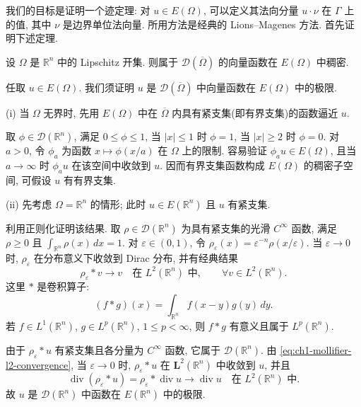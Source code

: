我们的目标是证明一个迹定理: 对 $u\in E(\Omega)$, 可以定义其法向分量 $u\cdot\nu$ 在 $\Gamma$ 上的值, 其中 $\nu$ 是边界单位法向量. 所用方法是经典的 Lions--Magenes 方法. 首先证明下述定理.

\begin{Theorem}
\label{thm:ch1-density-in-e}
设 $\Omega$ 是 $\mathbb R^n$ 中的 Lipschitz 开集. 则属于 $\mathbf{\mathcal D}(\overline\Omega)$ 的向量函数在 $E(\Omega)$ 中稠密.
\end{Theorem}

\begin{Proof}
任取 $u\in E(\Omega)$. 我们须证明 $u$ 是 $\mathbf{\mathcal D}(\overline\Omega)$ 中向量函数在 $E(\Omega)$ 中的极限.

(i) 当 $\Omega$ 无界时, 先用 $E(\Omega)$ 中在 $\overline\Omega$ 内具有紧支集(即有界支集)的函数逼近 $u$.

取 $\phi\in\mathcal D(\mathbb R^n)$, 满足 $0\leq\phi\leq1$, 当 $\lvert x\rvert\leq1$ 时 $\phi=1$, 当 $\lvert x\rvert\geq2$ 时 $\phi=0$. 对 $a>0$, 令 $\phi_a$ 为函数 $x\mapsto\phi(x/a)$ 在 $\Omega$ 上的限制. 容易验证 $\phi_a u\in E(\Omega)$, 且当 $a\to\infty$ 时 $\phi_a u$ 在该空间中收敛到 $u$. 因而有界支集函数构成 $E(\Omega)$ 的稠密子空间, 可假设 $u$ 有有界支集.

(ii) 先考虑 $\Omega=\mathbb R^n$ 的情形; 此时 $u\in E(\mathbb R^n)$ 且 $u$ 有紧支集.

利用正则化证明该结果. 取 $\rho\in\mathcal D(\mathbb R^n)$ 为具有紧支集的光滑 $C^\infty$ 函数, 满足 $\rho\geq0$ 且 $\int_{\mathbb R^n}\rho(x)\,dx=1$. 对 $\varepsilon\in(0,1)$, 令 $\rho_\varepsilon(x)=\varepsilon^{-n}\rho(x/\varepsilon)$. 当 $\varepsilon\to0$ 时, $\rho_\varepsilon$ 在分布意义下收敛到 Dirac 分布, 并有经典结果
\begin{equation}
\rho_\varepsilon*v\longrightarrow v\quad\text{在 }L^2(\mathbb R^n)\text{ 中},
\qquad\forall v\in L^2(\mathbb R^n).
\label{eq:ch1-mollifier-l2-convergence}
\end{equation}
这里 $*$ 是卷积算子:
\[
(f*g)(x)=\int_{\mathbb R^n}f(x-y)g(y)\,dy.
\]
若 $f\in L^1(\mathbb R^n)$, $g\in L^p(\mathbb R^n)$, $1\leq p<\infty$, 则 $f*g$ 有意义且属于 $L^p(\mathbb R^n)$.

由于 $\rho_\varepsilon*u$ 有紧支集且各分量为 $C^\infty$ 函数, 它属于 $\mathbf{\mathcal D}(\mathbb R^n)$. 由 \eqref{eq:ch1-mollifier-l2-convergence}, 当 $\varepsilon\to0$ 时, $\rho_\varepsilon*u$ 在 $\mathbf L^2(\mathbb R^n)$ 中收敛到 $u$, 并且
\[
\operatorname{div}(\rho_\varepsilon*u)
=\rho_\varepsilon*\operatorname{div}u
\longrightarrow\operatorname{div}u
\quad\text{在 }L^2(\mathbb R^n)\text{ 中}.
\]
故 $u$ 是 $\mathbf{\mathcal D}(\mathbb R^n)$ 中函数在 $E(\mathbb R^n)$ 中的极限.


\end{Proof}
